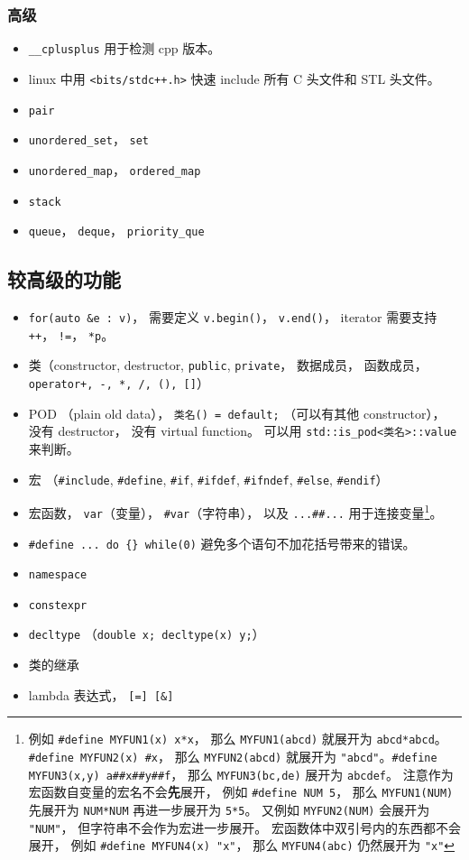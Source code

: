 \subsubsection{高级}
\begin{itemize}
\item \verb`__cplusplus` 用于检测 cpp 版本。
\item linux 中用 \verb`<bits/stdc++.h>` 快速 include 所有 C 头文件和 STL 头文件。
\item \verb`pair`
\item \verb`unordered_set`， \verb`set`
\item \verb`unordered_map`， \verb`ordered_map`
\item \verb`stack`
\item \verb`queue`， \verb`deque`， \verb`priority_que`
\end{itemize}

\subsection{较高级的功能}
\begin{itemize}
\item \verb`for(auto &e : v)`， 需要定义 \verb`v.begin()`， \verb`v.end()`， iterator 需要支持 \verb`++`， \verb`!=`， \verb`*p`。
\item 类（constructor, destructor, \verb`public`, \verb`private`， 数据成员， 函数成员， \verb`operator+, -, *, /, (), []`）
\item POD （plain old data）， \verb`类名() = default;` （可以有其他 constructor）， 没有 destructor， 没有 virtual function。 可以用 \verb`std::is_pod<类名>::value` 来判断。
\item 宏 （\verb`#include`, \verb`#define`, \verb`#if`, \verb`#ifdef`, \verb`#ifndef`, \verb`#else`, \verb`#endif`）
\item 宏函数， \verb`var`（变量）， \verb`#var`（字符串）， 以及 \verb`...##...` 用于连接变量\footnote{例如 \verb`#define MYFUN1(x) x*x`， 那么 \verb`MYFUN1(abcd)` 就展开为 \verb`abcd*abcd`。 \verb`#define MYFUN2(x) #x`， 那么 \verb`MYFUN2(abcd)` 就展开为 \verb`"abcd"`。\verb`#define MYFUN3(x,y) a##x##y##f`， 那么 \verb`MYFUN3(bc,de)` 展开为 \verb`abcdef`。 注意作为宏函数自变量的宏名不会\textbf{先}展开， 例如 \verb`#define NUM 5`， 那么 \verb`MYFUN1(NUM)` 先展开为 \verb`NUM*NUM` 再进一步展开为 \verb`5*5`。 又例如 \verb`MYFUN2(NUM)` 会展开为 \verb`"NUM"`， 但字符串不会作为宏进一步展开。 宏函数体中双引号内的东西都不会展开， 例如 \verb`#define MYFUN4(x) "x"`， 那么 \verb`MYFUN4(abc)` 仍然展开为 \verb`"x"`}。
\item \verb`#define ... do {} while(0)` 避免多个语句不加花括号带来的错误。
\item \verb`namespace`
\item \verb`constexpr`
\item \verb`decltype` （\verb`double x; decltype(x) y;`）
\item 类的继承
\item lambda 表达式， \verb`[=] [&]` 
\end{itemize}


